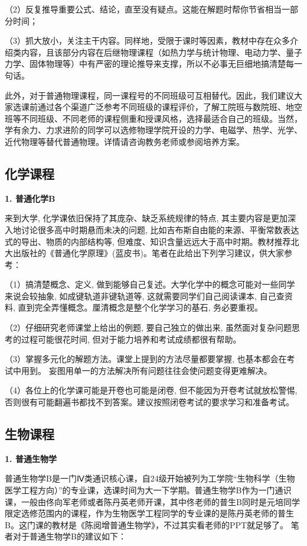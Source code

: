 \documentclass[11pt,oneside]{book}
\begin{document}
（2）反复推导重要公式、结论，直至没有疑点。这能在解题时帮你节省相当一部分时间；

（3）抓大放小，关注主干内容。同样地，受限于课时等因素，教材中存在众多介绍类内容，且该部分内容在后继物理课程（如热力学与统计物理、电动力学、量子力学、固体物理等）中有严密的理论推导来支撑，所以不必事无巨细地搞清楚每一句话。

\vspace{10pt}

此外，对于普通物理课程，同一课程号的不同班级可互相替代。因此，我们建议大家选课前通过各个渠道广泛参考不同班级的课程评价，了解工院班与数院班、地空班等不同班级、不同老师的课程侧重和授课风格，选择最适合自己的班级。当然，学有余力、力求进阶的同学可以选修物理学院开设的力学、电磁学、热学、光学、近代物理等替代普通物理。详情请咨询教务老师或参阅培养方案。

\subsection{化学课程}

\textbf{1. 普通化学B}

来到大学, 化学课依旧保持了其庞杂、缺乏系统规律的特点, 其主要内容是更加深入地讨论很多高中时期悬而未决的问题, 比如吉布斯自由能的来源、平衡常数表达式的导出、物质的内部结构等, 但难度、知识含量远远大于高中时期。教材推荐北大出版社的《普通化学原理》(蓝皮书)。笔者在此给出下列学习建议，供大家参考：

（1）搞清楚概念、定义, 做到能够自己复述。大学化学中的概念可能对一些同学来说会较抽象, 如成键轨道非键轨道等, 这就需要同学们自己阅读课本, 自己查资料, 直到完全弄懂概念。厘清概念是整个化学学习的基石, 务必要重视。

（2）仔细研究老师课堂上给出的例题, 要自己独立的做出来, 虽然面对复杂问题思考的过程可能很花时间, 但对于能力培养和考试成绩都很有帮助。

（3）掌握多元化的解题方法。课堂上提到的方法尽量都要掌握, 也基本都会在考试中用到。 妄图用单一的方法解决所有问题往往会使问题变得更难解决。

（4）各位上的化学课可能是开卷也可能是闭卷, 但不能因为开卷考试就放松警惕, 否则很有可能翻遍书都找不到答案。建议按照闭卷考试的要求学习和准备考试。


\subsection{生物课程}

\textbf{1. 普通生物学}

普通生物学B是一门Ⅳ类通识核心课，自24级开始被列为工学院“生物科学（生物医学工程方向）”的专业课，选课时间为大一下学期。普通生物学B作为一门通识课，一般由佟向军老师或者陈丹英老师开课，其中佟老师的普生B同时是元培同学限定选修范围内的课程，作为生物医学工程同学的专业课的是陈丹英老师的普生B。这门课的教材是《陈阅增普通生物学》，不过其实看老师的PPT就足够了。
笔者对于普通生物学B的建议如下：
\end{document}
